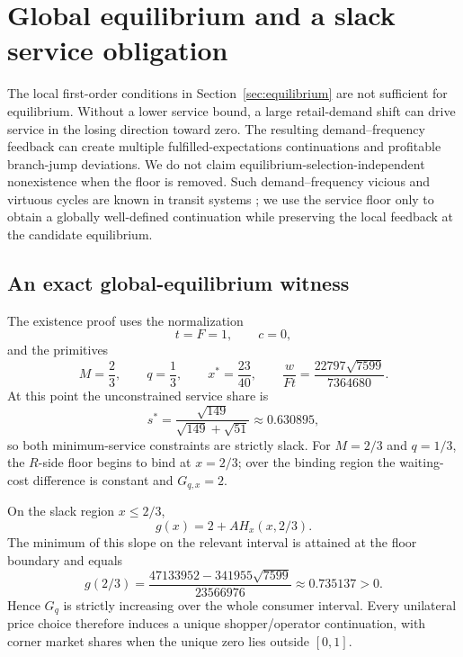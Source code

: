 \section{Global equilibrium and a slack service obligation}\label{sec:global}

The local first-order conditions in Section~\ref{sec:equilibrium} are not sufficient for equilibrium. Without a lower service bound, a large retail-demand shift can drive service in the losing direction toward zero. The resulting demand--frequency feedback can create multiple fulfilled-expectations continuations and profitable branch-jump deviations. We do not claim equilibrium-selection-independent nonexistence when the floor is removed. Such demand--frequency vicious and virtuous cycles are known in transit systems \citep{baryosef2013}; we use the service floor only to obtain a globally well-defined continuation while preserving the local feedback at the candidate equilibrium.

\subsection{An exact global-equilibrium witness}

The existence proof uses the normalization
\begin{equation}
t=F=1,\qquad c=0,
\end{equation}
and the primitives
\begin{equation}
M=\frac23,\qquad q=\frac13,
\qquad x^*=\frac{23}{40},
\qquad
\frac{w}{Ft}=\frac{22797\sqrt{7599}}{7364680}.
\label{eq:witness}
\end{equation}
At this point the unconstrained service share is
\begin{equation}
s^*=\frac{\sqrt{149}}{\sqrt{149}+\sqrt{51}}\approx0.630895,
\end{equation}
so both minimum-service constraints are strictly slack. For $M=2/3$ and $q=1/3$, the $R$-side floor begins to bind at $x=2/3$; over the binding region the waiting-cost difference is constant and $G_{q,x}=2$.

On the slack region $x\leq2/3$,
\begin{equation}
g(x)=2+A H_x(x,2/3).
\end{equation}
The minimum of this slope on the relevant interval is attained at the floor boundary and equals
\begin{equation}
g(2/3)
=\frac{47133952-341955\sqrt{7599}}{23566976}
\approx0.735137>0.
\label{eq:global_monotonicity}
\end{equation}
Hence $G_q$ is strictly increasing over the whole consumer interval. Every unilateral price choice therefore induces a unique shopper/operator continuation, with corner market shares when the unique zero lies outside $[0,1]$.

